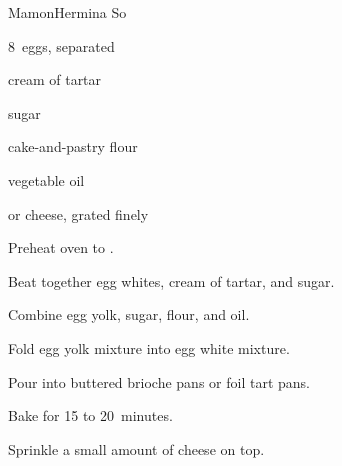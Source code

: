 \begin{recipe}{Mamon}{Hermina So}{}

\begin{ingredients}
\item 8~eggs, separated
\item \tp{\half} cream of tartar
\item \C{1\twothird} sugar
\item {} cake-and-pastry flour
\item \C{\half} vegetable oil
\item {} or  cheese, grated finely
\end{ingredients}

\begin{directions}
\item Preheat oven to .
\item Beat together egg whites, cream of tartar, and \C{\twothird} sugar.
\item Combine egg yolk,  sugar, flour, and oil.
\item Fold egg yolk mixture into egg white mixture.
\item Pour into buttered brioche pans or foil tart pans.
\item Bake for 15 to 20~minutes.
\item Sprinkle a small amount of cheese on top.
\end{directions}

\end{recipe}
